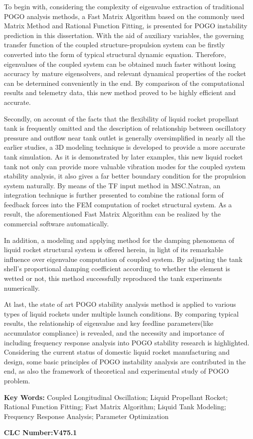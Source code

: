 To begin with, considering the complexity of eigenvalue extraction of traditional POGO analysis methods, a Fast Matrix Algorithm based on the commonly used Matrix Method and Rational Function Fitting, is presented for POGO instability prediction in this dissertation. With the aid of auxiliary variables, the governing transfer function of the coupled structure-propulsion system can be firstly converted into the form of typical structural dynamic equation. Therefore, eigenvalues of the coupled system can be obtained much faster without losing accuracy by mature eigensolvers, and relevant dynamical properties of the rocket can be determined conveniently in the end. By comparison of the computational results and telemetry data, this new method proved to be highly efficient and accurate.


Secondly, on account of the facts that the flexibility of liquid rocket propellant tank is frequently omitted and the description of relationship between oscillatory pressure and outflow near tank outlet is generally oversimplified in nearly all the earlier studies, a 3D modeling technique is developed to provide a more accurate tank simulation. As it is demonstrated by later examples, this new liquid rocket tank not only can provide more valuable vibration modes for the coupled system stability analysis, it also gives a far better boundary condition for the propulsion system naturally. By means of the TF input method in MSC.Natran, an integration technique is further presented to combine the rational form of feedback forces into the FEM computation of rocket structural system. As a result, the aforementioned Fast Matrix Algorithm can be realized by the commercial software automatically.

In addition, a modeling and applying method for the damping phenomena of liquid rocket structural system is offered herein, in light of its remarkable influence over eigenvalue computation of coupled system. By adjusting the tank shell's proportional damping coefficient according to whether the element is wetted or not, this method successfully reproduced the tank experiments numerically.

At last, the state of art POGO stability analysis method is applied to various types of liquid rockets under multiple launch conditions. By comparing typical results, the relationship of eigenvalue and key feedline parameters(like accumulator compliance) is revealed, and the necessity and importance of including frequency response analysis into POGO stability research is highlighted. Considering the current status of domestic liquid rocket manufacturing and design, some basic principles of POGO instability analysis are contributed in the end, as also the framework of theoretical and experimental study of POGO problem.

\bigskip
\noindent \textbf{Key Words:\hspace{\Han}}
Coupled Longitudinal Oscillation;\;
Liquid Propellant Rocket;\;
Rational Function Fitting;\;
Fast Matrix Algorithm;\;
Liquid Tank Modeling;\;
Frequency Response Analysis;\;
Parameter Optimization

\bigskip
\noindent \textbf{CLC Number:\hspace{\Han}V475.1}

